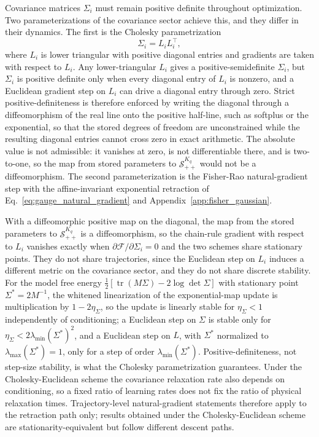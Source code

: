 Covariance matrices $\Sigma_i$ must remain positive definite throughout optimization. Two parameterizations of the covariance sector achieve this, and they differ in their dynamics. The first is the Cholesky parametrization
\begin{equation}
\Sigma_i = L_i L_i^\top,
\end{equation}
where $L_i$ is lower triangular with positive diagonal entries and gradients are taken with respect to $L_i$. Any lower-triangular $L_i$ gives a positive-semidefinite $\Sigma_i$, but $\Sigma_i$ is positive definite only when every diagonal entry of $L_i$ is nonzero, and a Euclidean gradient step on $L_i$ can drive a diagonal entry through zero. Strict positive-definiteness is therefore enforced by writing the diagonal through a diffeomorphism of the real line onto the positive half-line, such as softplus or the exponential, so that the stored degrees of freedom are unconstrained while the resulting diagonal entries cannot cross zero in exact arithmetic. The absolute value is not admissible: it vanishes at zero, is not differentiable there, and is two-to-one, so the map from stored parameters to $\mathcal{S}_{++}^{K_q}$ would not be a diffeomorphism. The second parameterization is the Fisher-Rao natural-gradient step with the affine-invariant exponential retraction of Eq.~\eqref{eq:gauge_natural_gradient} and Appendix~\ref{app:fisher_gaussian}.

With a diffeomorphic positive map on the diagonal, the map from the stored parameters to $\mathcal{S}_{++}^{K_q}$ is a diffeomorphism, so the chain-rule gradient with respect to $L_i$ vanishes exactly when $\partial\mathcal{F}/\partial\Sigma_i = 0$ and the two schemes share stationary points. They do not share trajectories, since the Euclidean step on $L_i$ induces a different metric on the covariance sector, and they do not share discrete stability. For the model free energy $\tfrac{1}{2}[\operatorname{tr}(M\Sigma) - 2\log\det\Sigma]$ with stationary point $\Sigma^* = 2M^{-1}$, the whitened linearization of the exponential-map update is multiplication by $1 - 2\eta_\Sigma$, so the update is linearly stable for $\eta_\Sigma < 1$ independently of conditioning; a Euclidean step on $\Sigma$ is stable only for $\eta_\Sigma < 2\lambda_{\min}(\Sigma^*)^2$, and a Euclidean step on $L$, with $\Sigma^*$ normalized to $\lambda_{\max}(\Sigma^*) = 1$, only for a step of order $\lambda_{\min}(\Sigma^*)$. Positive-definiteness, not step-size stability, is what the Cholesky parametrization guarantees. Under the Cholesky-Euclidean scheme the covariance relaxation rate also depends on conditioning, so a fixed ratio of learning rates does not fix the ratio of physical relaxation times. Trajectory-level natural-gradient statements therefore apply to the retraction path only; results obtained under the Cholesky-Euclidean scheme are stationarity-equivalent but follow different descent paths.

